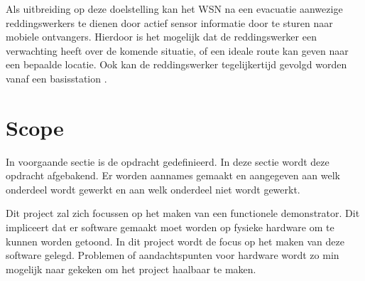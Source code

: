 \documentclass{../local}
\begin{document}
Als uitbreiding op deze doelstelling kan het WSN na een evacuatie aanwezige reddingswerkers te dienen door actief sensor informatie door te sturen naar mobiele ontvangers. Hierdoor is het mogelijk dat de reddingswerker een verwachting heeft over de komende situatie, of een ideale route kan geven naar een bepaalde locatie. Ook kan de reddingswerker tegelijkertijd gevolgd worden vanaf een basisstation \cite{ShaWSN}.

\section{Scope}
In voorgaande sectie is de opdracht gedefinieerd. In deze sectie wordt deze opdracht afgebakend. Er worden aannames gemaakt en aangegeven aan welk onderdeel wordt gewerkt en aan welk onderdeel niet wordt gewerkt.

Dit project zal zich focussen op het maken van een functionele demonstrator. Dit impliceert dat er software gemaakt moet worden op fysieke hardware om te kunnen worden getoond. In dit project wordt de focus op het maken van deze software gelegd. Problemen of aandachtspunten voor hardware wordt zo min mogelijk naar gekeken om het project haalbaar te maken.
\end{document}
